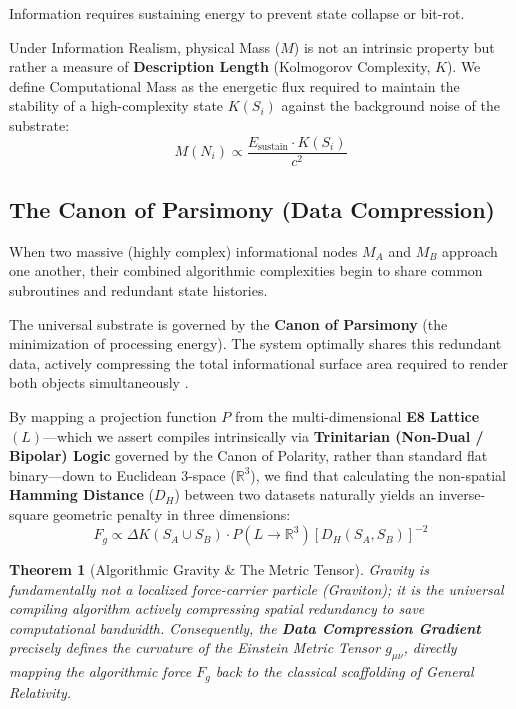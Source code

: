 \documentclass[12pt, a4paper]{article}
\theoremstyle{plain}
\newtheorem{theorem}{Theorem}[section]
\theoremstyle{definition}
\begin{document}
\begin{axiom}
Information requires sustaining energy to prevent state collapse or bit-rot.
\end{axiom}

Under Information Realism, physical Mass ($M$) is not an intrinsic property but rather a measure of \textbf{Description Length} (Kolmogorov Complexity, $K$). We define Computational Mass as the energetic flux required to maintain the stability of a high-complexity state $K(S_i)$ against the background noise of the substrate:
\begin{equation}
M(N_i) \propto \frac{E_{\text{sustain}} \cdot K(S_i)}{c^2}
\end{equation}

\subsection{The Canon of Parsimony (Data Compression)}

When two massive (highly complex) informational nodes $M_A$ and $M_B$ approach one another, their combined algorithmic complexities begin to share common subroutines and redundant state histories. 

The universal substrate is governed by the \textbf{Canon of Parsimony} (the minimization of processing energy). The system optimally shares this redundant data, actively compressing the total informational surface area required to render both objects simultaneously \citep{Hooft1993, Vitanyi2008}.

By mapping a projection function $P$ from the multi-dimensional \textbf{E8 Lattice} $(L)$---which we assert compiles intrinsically via \textbf{Trinitarian (Non-Dual / Bipolar) Logic} governed by the Canon of Polarity, rather than standard flat binary---down to Euclidean 3-space ($\mathbb{R}^3$), we find that calculating the non-spatial \textbf{Hamming Distance} ($D_H$) between two datasets naturally yields an inverse-square geometric penalty in three dimensions:
\begin{equation}
F_g \propto \Delta K(S_A \cup S_B) \cdot P(L \to \mathbb{R}^3)[D_H(S_A, S_B)]^{-2}
\end{equation}

\begin{theorem}[Algorithmic Gravity \& The Metric Tensor]
Gravity is fundamentally not a localized force-carrier particle (Graviton); it is the universal compiling algorithm actively compressing spatial redundancy to save computational bandwidth. Consequently, the \textbf{Data Compression Gradient} precisely defines the curvature of the Einstein Metric Tensor $g_{\mu\nu}$, directly mapping the algorithmic force $F_g$ back to the classical scaffolding of General Relativity.
\end{theorem}
\end{document}
